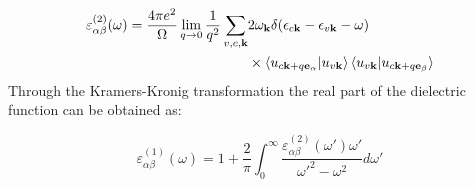 \documentclass[journal=ancac3,email=true,hyperref=true,keywords=false]{achemso}
\begin{document}
\begin{equation}
\begin{aligned}
  \label{eq:dft-dielectric}
\varepsilon_{\alpha\beta}^{(2)}(\omega)=\frac{4\pi e^2}{\Omega}\lim\limits_{q\rightarrow 0}\frac{1}{q^2}\sum_{v,c,\mathbf{k}}&2\omega_\mathbf{k}\delta(\epsilon_{c\mathbf{k}}-\epsilon_{v\mathbf{k}}-\omega) \\
&\times\braket{u_{c\mathbf{k}+q\mathbf{e}_\alpha}|u_{v\mathbf{k}}}\braket{u_{v\mathbf{k}}|u_{c\mathbf{k}+q\mathbf{e}_\beta}}
\end{aligned}
\end{equation}
Through the Kramers-Kronig transformation the real part of the dielectric function can be obtained as: 

\begin{equation}
\label{eq:dft-dielectric-real}
  \varepsilon_{\alpha\beta}^{(1)}(\omega)=1+\frac{2}{\pi}\int_0^\infty\frac{\varepsilon_{\alpha\beta}^{(2)}(\omega')\omega'}{\omega'^2-\omega^2}d\omega'
\end{equation}
\end{document}
